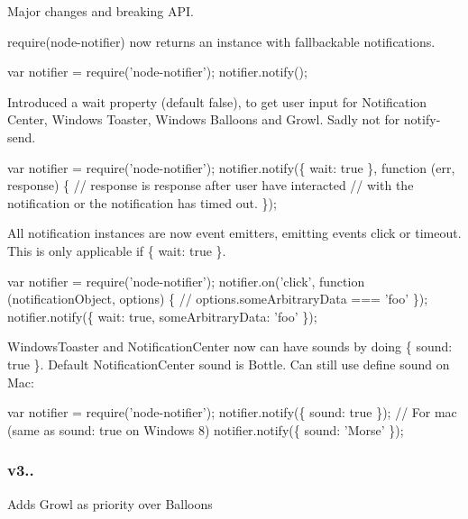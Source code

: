 Major changes and breaking A\+PI.
\begin{DoxyEnumerate}
\item require(\textquotesingle{}node-\/notifier\textquotesingle{}) now returns an instance with fallbackable notifications. 
\begin{DoxyCode}
var notifier = require('node-notifier');
notifier.notify();
\end{DoxyCode}

\item Introduced a {\ttfamily wait} property (default {\ttfamily false}), to get user input for Notification Center, Windows Toaster, Windows Balloons and Growl. Sadly not for notify-\/send. 
\begin{DoxyCode}
var notifier = require('node-notifier');
notifier.notify(\{ wait: true \}, function (err, response) \{
     // response is response after user have interacted
     // with the notification or the notification has timed out.
\});
\end{DoxyCode}

\item All notification instances are now event emitters, emitting events {\ttfamily click} or {\ttfamily timeout}. This is only applicable if {\ttfamily \{ wait\+: true \}}. 
\begin{DoxyCode}
var notifier = require('node-notifier');
notifier.on('click', function (notificationObject, options) \{
     // options.someArbitraryData === 'foo'
\});
notifier.notify(\{ wait: true, someArbitraryData: 'foo' \});
\end{DoxyCode}

\item Windows\+Toaster and Notification\+Center now can have sounds by doing {\ttfamily \{ sound\+: true \}}. Default Notification\+Center sound is Bottle. Can still use define sound on Mac\+: 
\begin{DoxyCode}
var notifier = require('node-notifier');
notifier.notify(\{ sound: true \});
// For mac (same as sound: true on Windows 8)
notifier.notify(\{ sound: 'Morse' \});
\end{DoxyCode}

\end{DoxyEnumerate}

\subsubsection*{{\ttfamily v3..}}


\begin{DoxyEnumerate}
\item Adds Growl as priority over Balloons
\end{DoxyEnumerate}

